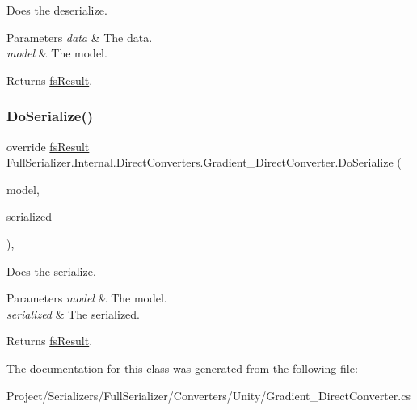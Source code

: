 Does the deserialize. 


\begin{DoxyParams}{Parameters}
{\em data} & The data.\\
\hline
{\em model} & The model.\\
\hline
\end{DoxyParams}
\begin{DoxyReturn}{Returns}
\hyperlink{struct_full_serializer_1_1fs_result}{fs\+Result}.
\end{DoxyReturn}
\mbox{\label{class_full_serializer_1_1_internal_1_1_direct_converters_1_1_gradient___direct_converter_a9fdf07059a4318c6942e358749930ace}} 
\subsubsection{\texorpdfstring{Do\+Serialize()}{DoSerialize()}}
{\footnotesize\ttfamily override \hyperlink{struct_full_serializer_1_1fs_result}{fs\+Result} Full\+Serializer.\+Internal.\+Direct\+Converters.\+Gradient\+\_\+\+Direct\+Converter.\+Do\+Serialize (\begin{DoxyParamCaption}\item[{Gradient}]{model,  }\item[{Dictionary$<$ string, \hyperlink{class_full_serializer_1_1fs_data}{fs\+Data} $>$}]{serialized }\end{DoxyParamCaption})\hspace{0.3cm}{\ttfamily [inline]}, {\ttfamily [protected]}}



Does the serialize. 


\begin{DoxyParams}{Parameters}
{\em model} & The model.\\
\hline
{\em serialized} & The serialized.\\
\hline
\end{DoxyParams}
\begin{DoxyReturn}{Returns}
\hyperlink{struct_full_serializer_1_1fs_result}{fs\+Result}.
\end{DoxyReturn}


The documentation for this class was generated from the following file\+:\begin{DoxyCompactItemize}
\item 
Project/\+Serializers/\+Full\+Serializer/\+Converters/\+Unity/Gradient\+\_\+\+Direct\+Converter.\+cs\end{DoxyCompactItemize}

